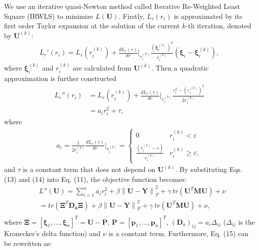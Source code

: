 \documentclass[conference]{IEEEtran}
\begin{document}
We use an iterative quasi-Newton method called Iterative Re-Weighted Least Square (IRWLS) \cite{perez2001fast,tuia2011multioutput} to minimize $L(\bm{U})$. Firstly, $L_r(r_i)$ is approximated by its first order Taylor expansion at the solution of the current $k$-th iteration, denoted by $\bm{U}^{(k)}$:
\begin{equation}
\begin{split}
L_r'(r_i)=L_r(r_i^{(k)})+\frac{dL_r(r)}{dr} \bigg|_{r_i^{(k)}} \frac{(\bm{\xi}_i^{(k)})^T}{r_i^{(k)}}(\bm{\xi}_i-\bm{\xi}_i^{(k)}),
\end{split}
\end{equation}
where $\bm{\xi}_i^{(k)}$ and $r_i^{(k)}$ are calculated from $\bm{U}^{(k)}$. Then a quadratic approximation is further constructed
\begin{equation}
\begin{split}
L_r''(r_i)&=L_r(r_i^{(k)})+\frac{dL_r(r)}{dr} \bigg|_{r_i^{(k)}} \frac{r_i^2-(r_i^{(k)})^2}{2r_i^{(k)}}\\
&=a_ir_i^2+\tau,
\end{split}
\end{equation}
where
\begin{equation}
\begin{split}
a_i=\frac{1}{2r_i^{(k)}}\frac{dL_r(r)}{dr} \bigg|_{r_i^{(k)}}=
\left\{
     \begin{array}{lr}
     0 &r_i^{(k)}<\varepsilon\\
     \frac{(r_i^{(k)}-\varepsilon)}{r_i^{(k)}} &r_i^{(k)} \geq \varepsilon,
     \end{array}
\right.
\end{split}
\end{equation}
and $\tau$ is a constant term that does not depend on $\bm{U}^{(k)}$. By substituting Eqs. (13) and (14) into Eq. (11), the  objective function becomes:
\begin{equation}
\begin{split}
&L''(\bm{U})=\sum_{i=1}^na_ir_i^2 + \beta \left\lVert \bm{U} - \bm{Y} \right\rVert_F^2 + \gamma\ tr(\bm{U}^T\bm{M}\bm{U}) + \nu\\
&=tr(\bm{\Xi}^T \bm{D_a} \bm{\Xi}) + \beta \left\lVert \bm{U} - \bm{Y} \right\rVert_F^2 + \gamma \ tr(\bm{U}^T\bm{M}\bm{U}) + \nu,\\
\end{split}
\end{equation}
where $\bm{\Xi}=[\bm{\xi}_1, ... , \bm{\xi}_n]^T=\bm{U}-\bm{P}$, $\bm{P}=[\bm{p}_1, ... , \bm{p}_n]^T$, $(\bm{D}_a)_{ij}=a_i\Delta_{ij}$ ($\Delta_{ij}$ is the Kronecker's delta function) and $\nu$ is a constant term. Furthermore, Eq. (15) can be rewritten as:
\end{document}

